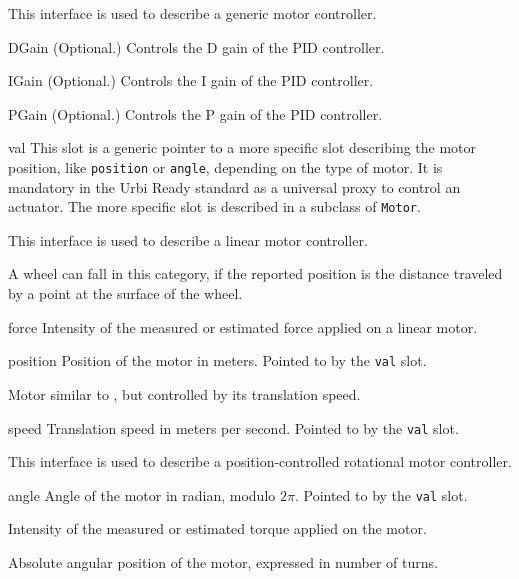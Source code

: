 
This interface is used to describe a generic motor controller.

\begin{urbiscriptapi}
\item[DGain]{} (Optional.) Controls the D gain of the PID controller.


\item[IGain]{} (Optional.) Controls the I gain of the PID controller.


\item[PGain]{} (Optional.) Controls the P gain of the PID controller.


\item[val] This slot is a generic pointer to a more specific slot describing
  the motor position, like \lstinline{position} or \lstinline{angle},
  depending on the type of motor. It is mandatory in the Urbi Ready standard
  as a universal proxy to control an actuator. The more specific slot is
  described in a subclass of \lstinline{Motor}.
\end{urbiscriptapi}


This interface is used to describe a linear motor controller.

A wheel can fall in this category, if the reported position is the distance
traveled by a point at the surface of the wheel.

\begin{urbiscriptapi}
\item[force] Intensity of the measured or estimated force applied on a
  linear motor.


\item[position] Position of the motor in meters.  Pointed to by the
  \lstinline{val} slot.
\end{urbiscriptapi}


Motor similar to , but controlled by its
translation speed.

\begin{urbiscriptapi}
\item[speed] Translation speed in meters per second. Pointed to by the
  \lstinline{val} slot.
\end{urbiscriptapi}


This interface is used to describe a position-controlled rotational motor
controller.

\begin{urbiscriptapi}
\item[angle] Angle of the motor in radian, modulo $2\pi$. Pointed to by the
  \lstinline{val} slot.


\item[torque] Intensity of the measured or estimated torque applied on the
  motor.


\item[turn] Absolute angular position of the motor, expressed in number of
  turns.
\end{urbiscriptapi}


